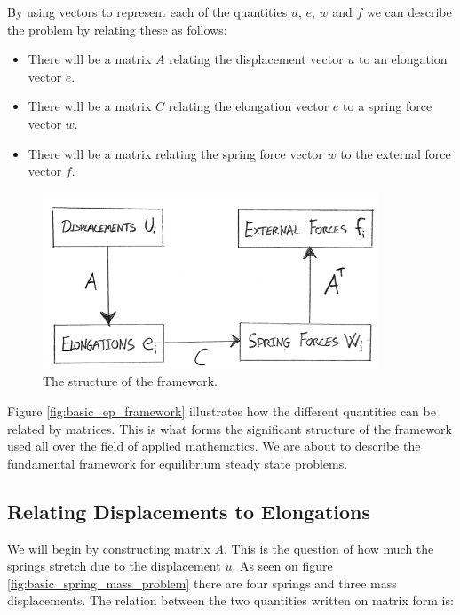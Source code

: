 
By using vectors to represent each of the quantities $u$, $e$, $w$ and
$f$ we can describe the problem by relating these as follows:

\begin{itemize}
\item There will be a matrix $A$ relating the displacement vector
$u$ to an elongation vector $e$.
\item There will be a matrix $C$ relating the elongation vector $e$
  to a spring force vector $w$.
\item There will be a matrix relating the spring force vector $w$ to the
  external force vector $f$. %
\end{itemize}

\begin{figure}
  \centering
  \includegraphics[width=10cm]{./images/equilibrium_framework_basic_ep_framework.png}
\caption{The structure of the framework.}
\label{fig:basic_ep_framework}
\end{figure}

Figure \vref{fig:basic_ep_framework} illustrates how the different
quantities can be related by matrices. This is what forms the significant structure
of the framework used all over the field of applied mathematics. We
are about to describe the fundamental framework for
equilibrium steady state problems. \\

\subsection{Relating Displacements to Elongations}
We will begin by constructing matrix $A$. This is the question of
how much the springs stretch due to the displacement $u$. As seen
on figure \vref{fig:basic_spring_mass_problem} there are four springs
and three mass displacements. The relation between the two quantities
written on matrix form is:

